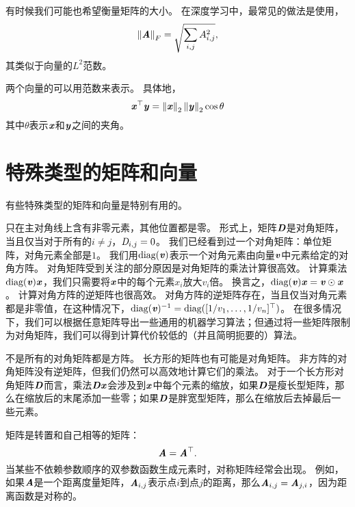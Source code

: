 有时候我们可能也希望衡量矩阵的大小。
在深度学习中，最常见的做法是使用，
\begin{equation}
    \norm{\MA}_F = \sqrt{\sum_{i,j} A_{i,j}^2}, 
\end{equation}
其类似于向量的$L^2$范数。


两个向量的可以用范数来表示。
具体地，
\begin{equation}
    \Vx^\top\Vy = \norm{\Vx}_2\norm{\Vy}_2 \cos \theta
\end{equation}
其中$\theta$表示$\Vx$和$\Vy$之间的夹角。




\section{特殊类型的矩阵和向量}
\label{sec:special_kinds_of_matrices_and_vectors}

有些特殊类型的矩阵和向量是特别有用的。


只在主对角线上含有非零元素，其他位置都是零。
形式上，矩阵$\MD$是对角矩阵，当且仅当对于所有的$i\neq j$，$\SD_{i,j}=0$。
我们已经看到过一个对角矩阵：单位矩阵，对角元素全部是$1$。
我们用$\text{diag}(\Vv)$表示一个对角元素由向量$\Vv$中元素给定的对角方阵。
对角矩阵受到关注的部分原因是对角矩阵的乘法计算很高效。
计算乘法$\text{diag}(\Vv)\Vx$，我们只需要将$\Vx$中的每个元素$x_i$放大$v_i$倍。
换言之，$\text{diag}(\Vv)\Vx=\Vv \odot \Vx$。
计算对角方阵的逆矩阵也很高效。
对角方阵的逆矩阵存在，当且仅当对角元素都是非零值，在这种情况下，$\text{diag}(\Vv)^{-1}=\text{diag}([1/v_1,\dots,1/v_n]^\top)$。
在很多情况下，我们可以根据任意矩阵导出一些通用的机器学习算法；但通过将一些矩阵限制为对角矩阵，我们可以得到计算代价较低的（并且简明扼要的）算法。


不是所有的对角矩阵都是方阵。
长方形的矩阵也有可能是对角矩阵。
非方阵的对角矩阵没有逆矩阵，但我们仍然可以高效地计算它们的乘法。
对于一个长方形对角矩阵$\MD$而言，乘法$\MD\Vx$会涉及到$\Vx$中每个元素的缩放，如果$\MD$是瘦长型矩阵，那么在缩放后的末尾添加一些零；如果$\MD$是胖宽型矩阵，那么在缩放后去掉最后一些元素。



矩阵是转置和自己相等的矩阵：
\begin{equation}
    \MA=\MA^\top.
\end{equation}
当某些不依赖参数顺序的双参数函数生成元素时，对称矩阵经常会出现。
例如，如果$\MA$是一个距离度量矩阵，$\MA_{i,j}$表示点$i$到点$j$的距离，那么$\MA_{i,j}=\MA_{j,i}$，因为距离函数是对称的。


